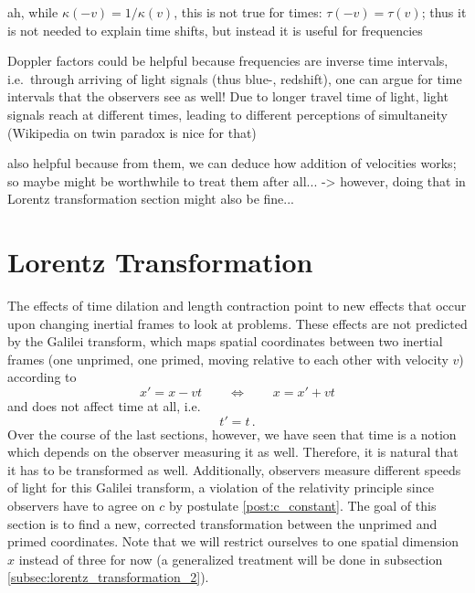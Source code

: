 ah, while $\kappa(-v) = 1 / \kappa(v)$, this is not true for times: $\tau(-v) = \tau(v)$; thus it is not needed to explain time shifts, but instead it is useful for frequencies


Doppler factors could be helpful because frequencies are inverse time intervals, i.e.~through arriving of light signals (thus blue-, redshift), one can argue for time intervals that the observers see as well! Due to longer travel time of light, light signals reach at different times, leading to different perceptions of simultaneity (Wikipedia on twin paradox is nice for that)


also helpful because from them, we can deduce how addition of velocities works; so maybe might be worthwhile to treat them after all... -> however, doing that in Lorentz transformation section might also be fine...



\newpage



	\section{Lorentz Transformation}\label{sec:lorentz_transformation_1}
The effects of time dilation and length contraction point to new effects that occur upon changing inertial frames to look at problems. These effects are not predicted by the Galilei transform, which maps spatial coordinates between two inertial frames (one unprimed, one primed, moving relative to each other with velocity $v$) according to 
\begin{equation*}
	x' = x - v t
	\qquad \Leftrightarrow \qquad
	x = x' + v t
\end{equation*}
and does not affect time at all, i.e.
\begin{equation*}
	t' = t \, .
\end{equation*}
Over the course of the last sections, however, we have seen that time is a notion which depends on the observer measuring it as well. Therefore, it is natural that it has to be transformed as well. Additionally, observers measure different speeds of light for this Galilei transform, a violation of the relativity principle since observers have to agree on $c$ by postulate \ref{post:c_constant}. The goal of this section is to find a new, corrected transformation between the unprimed and primed coordinates. Note that we will restrict ourselves to one spatial dimension $x$ instead of three for now (a generalized treatment will be done in subsection \ref{subsec:lorentz_transformation_2}).\\


